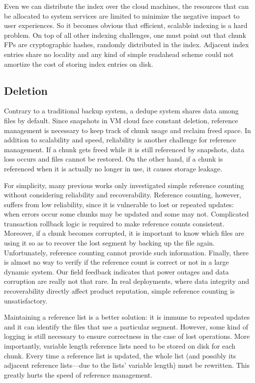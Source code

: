 {Even we can distribute the index over the cloud machines,
the resources that can be allocated to system services are
limited to minimize the negative impact to user experiences. 
So it becomes obvious that efficient, scalable indexing is
a hard problem. On top of all other indexing challenges,
one must point out that chunk FPs are cryptographic
hashes, randomly distributed in the index. Adjacent index
entries share no locality and any kind of simple readahead
scheme could not amortize the cost of storing index
entries on disk.


\subsection{Deletion}
Contrary to a traditional backup system, a dedupe system
shares data among files by default. 
Since snapshots in VM cloud face constant deletion, 
reference management
is necessary to keep track of chunk usage and reclaim
freed space. In addition to scalability and speed, reliability
is another challenge for reference management.
If a chunk gets freed while it is still referenced by snapshots,
data loss occurs and files cannot be restored. On the other
hand, if a chunk is referenced when it is actually no
longer in use, it causes storage leakage.

For simplicity, many previous works only investigated simple reference
counting without considering reliability
and recoverability. Reference counting, however, suffers
from low reliability, since it is vulnerable to lost or repeated
updates: when errors occur some chunks may
be updated and some may not. Complicated transaction
rollback logic is required to make reference counts consistent.
Moreover, if a chunk becomes corrupted, it is
important to know which files are using it so as to recover
the lost segment by backing up the file again. Unfortunately,
reference counting cannot provide such information.
Finally, there is almost no way to verify if the
reference count is correct or not in a large dynamic system.
Our field feedback indicates that power outages and
data corruption are really not that rare. In real deployments,
where data integrity and recoverability directly
affect product reputation, simple reference counting is
unsatisfactory.

Maintaining a reference list is a better solution: it is
immune to repeated updates and it can identify the files
that use a particular segment. However, some kind of logging
is still necessary to ensure correctness in the case of
lost operations. More importantly, variable length reference
lists need to be stored on disk for each chunk.
Every time a reference list is updated, the whole list (and
possibly its adjacent reference lists—due to the lists’
variable length) must be rewritten. This greatly hurts the
speed of reference management.

}
